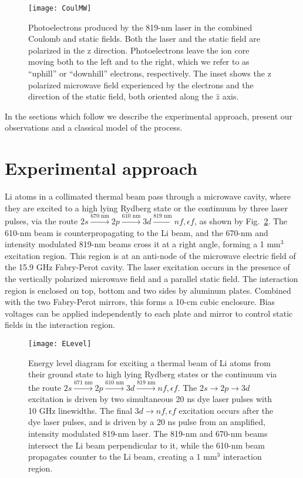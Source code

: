\documentclass[aps,pra,reprint,groupedaddress]{revtex4-1}
\begin{document}
\begin{figure}
	\texttt{[image: CoulMW]}
	\caption{Photoelectrons produced by the 819-nm laser in the combined Coulomb and static fields. Both the laser and the static field are polarized in the z direction. Photoelectrons leave the ion core moving both to the left and to the right, which we refer to as ``uphill'' or ``downhill'' electrons, respectively. The inset shows the z polarized microwave field experienced by the electrons and the direction of the static field, both oriented along the $\hat{z}$ axis.}
	\label{fig:CoulMW}
\end{figure}
In the sections which follow we describe the experimental approach, present our observations and a classical model of the process.

\section{\label{sec:exp} Experimental approach}

Li atoms in a collimated thermal beam pass through a microwave cavity, where they are excited to a high lying Rydberg state or the continuum by three laser pulses, via the route $2s \xrightarrow{\text{670 nm}} 2p \xrightarrow{\text{610 nm}} 3d \xrightarrow{\text{819 nm}} nf, \epsilon f$, as shown by Fig.~\ref{fig:ELev}. The 610-nm beam is counterpropagating to the Li beam, and the 670-nm and intensity modulated 819-nm beams cross it at a right angle, forming a 1 mm$^3$ excitation region. This region is at an anti-node of the microwave electric field of the 15.9 GHz Fabry-Perot cavity. The laser excitation occurs in the presence of the vertically polarized microwave field and a parallel static field. The interaction region is enclosed on top, bottom and two sides by aluminum plates. Combined with the two Fabry-Perot mirrors, this forms a 10-cm cubic enclosure. Bias voltages can be applied independently to each plate and mirror to control static fields in the interaction region.

\begin{figure}
	\texttt{[image: ELevel]}
	\caption{Energy level diagram for exciting a thermal beam of Li atoms from their ground state to high lying Rydberg states or the continuum via the route $2s \xrightarrow{\text{671 nm}} 2p \xrightarrow{\text{610 nm}} 3d \xrightarrow{\text{819 nm}} nf, \epsilon f$. The $2s \rightarrow 2p \rightarrow 3d$ excitation is driven by two simultaneous 20 ns dye laser pulses with 10 GHz linewidths. The final $3d \rightarrow nf, \epsilon f$ excitation occurs after the dye laser pulses, and is driven by a 20 ns pulse from an amplified, intensity modulated 819-nm laser. The 819-nm and 670-nm beams intersect the Li beam perpendicular to it, while the 610-nm beam propagates counter to the Li beam, creating a 1 mm$^3$ interaction region.}
	\label{fig:ELev}
\end{figure}
\end{document}
